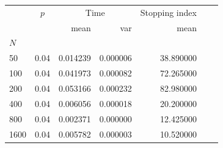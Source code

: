 \begin{tabular}{lrrrrrr}
\toprule
 & \multicolumn{1}{c}{$p$} & \multicolumn{2}{c}{Time} & \multicolumn{1}{c}{Stopping index} \\
 &  & mean & var & mean  \\
$N$ &  &  &  &  &  &  \\
\midrule
50 & 0.04 & 0.014239 & 0.000006 & 38.890000  \\
100 & 0.04 & 0.041973 & 0.000082 & 72.265000  \\
200 & 0.04 & 0.053166 & 0.000232 & 82.980000  \\
400 & 0.04 & 0.006056 & 0.000018 & 20.200000  \\
800 & 0.04 & 0.002371 & 0.000000 & 12.425000  \\
1600 & 0.04 & 0.005782 & 0.000003 & 10.520000  \\
\bottomrule
\end{tabular}

